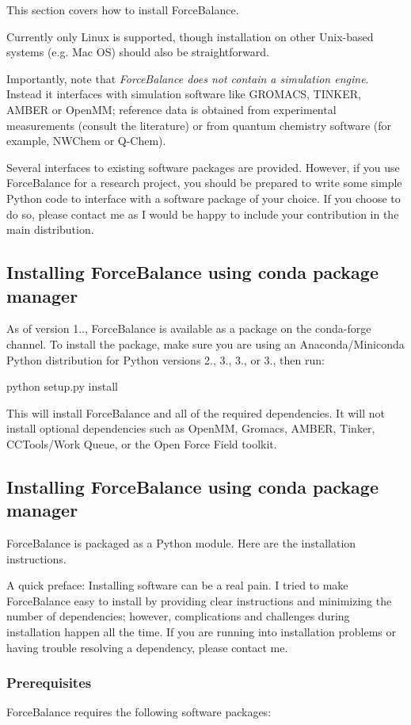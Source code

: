 This section covers how to install Force\+Balance.

Currently only Linux is supported, though installation on other Unix-\/based systems (e.\+g. Mac OS) should also be straightforward.

Importantly, note that {\itshape Force\+Balance does not contain a simulation engine}. Instead it interfaces with simulation software like G\+R\+O\+M\+A\+CS, T\+I\+N\+K\+ER, A\+M\+B\+ER or Open\+MM; reference data is obtained from experimental measurements (consult the literature) or from quantum chemistry software (for example, N\+W\+Chem or Q-\/\+Chem).

Several interfaces to existing software packages are provided. However, if you use Force\+Balance for a research project, you should be prepared to write some simple Python code to interface with a software package of your choice. If you choose to do so, please contact me as I would be happy to include your contribution in the main distribution.\hypertarget{installation_installing_forcebalance}{}\subsection{Installing Force\+Balance using conda package manager}\label{installation_installing_forcebalance}
As of version 1.., Force\+Balance is available as a package on the conda-\/forge channel. To install the package, make sure you are using an Anaconda/\+Miniconda Python distribution for Python versions 2., 3., 3., or 3., then run\+:

\begin{DoxyVerb}python setup.py install \end{DoxyVerb}


This will install Force\+Balance and all of the required dependencies. It will not install optional dependencies such as Open\+MM, Gromacs, A\+M\+B\+ER, Tinker, C\+C\+Tools/\+Work Queue, or the Open Force Field toolkit.\hypertarget{installation_installing_forcebalance}{}\subsection{Installing Force\+Balance using conda package manager}\label{installation_installing_forcebalance}
Force\+Balance is packaged as a Python module. Here are the installation instructions.

A quick preface\+: Installing software can be a real pain. I tried to make Force\+Balance easy to install by providing clear instructions and minimizing the number of dependencies; however, complications and challenges during installation happen all the time. If you are running into installation problems or having trouble resolving a dependency, please contact me.\hypertarget{installation_installing_forcebalance_prereq}{}\subsubsection{Prerequisites}\label{installation_installing_forcebalance_prereq}
Force\+Balance requires the following software packages\+:

